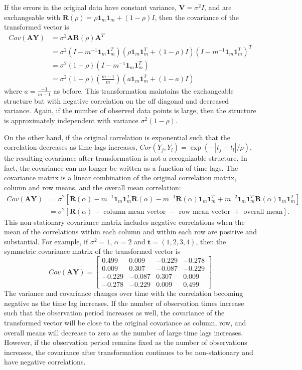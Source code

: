 \documentclass[12pt]{article}
\newcommand{\B}[0]{\mathbf}
\begin{document}
 If the errors in the original data have constant variance, $\B V=\sigma^{2}I$, and are exchangeable with $\B R(\rho) = \rho\B 1_{m} \B 1_{m} + (1-\rho) I$, then the covariance of the transformed vector is
 \begin{align*}
 Cov(\B A\B Y) &= \sigma^{2}\B A\B R(\rho)\B A^{T}\\
 &= \sigma^{2}(I-m^{-1}\B1_{m}\B1_{m}^{T})(\rho\B1_{m}\B1_{m}^{T}+(1-\rho)I)(I-m^{-1}\B1_{m}\B1_{m}^{T})^{T}\\
 &= \sigma^{2}(1-\rho)(I-m^{-1}\B1_{m}\B1_{m}^{T})\\
 &=\sigma^{2}(1-\rho)\left(\frac{m-1}{m}\right)(a\B 1_{m}\B 1_{m}^{T}+ (1-a)I)
 \end{align*} 
 where $a=\frac{-1}{m-1}$ as before. This transformation maintains the exchangeable structure but with negative correlation on the off diagonal and decreased variance.  Again, if the number of observed data points is large, then the structure is approximately independent with variance $\sigma^{2}(1-\rho)$.

 On the other hand, if the original correlation is exponential such that the correlation decreases as time lags increases, $Cor(Y_{j},Y_{l}) = \exp(-|t_{j}-t_{l}|/\rho)$, the resulting covariance after transformation is not a recognizable structure. In fact, the covariance can no longer be written as a function of time lags. The covariance matrix is a linear combination of the original correlation matrix, column and row means, and the overall mean correlation:
   \begin{align*}
 Cov(\B A\B Y) &= \sigma^{2}\left[\B R(\alpha)-m^{-1}\B1_{m}\B1_{m}^{T}\B R(\alpha)-m^{-1}\B R(\alpha)\B1_{m}\B1_{m}^{T} + m^{-2}\B1_{m}\B1_{m}^{T}\B R(\alpha)\B1_{m}\B1_{m}^{T}\right]\\
  &= \sigma^{2}\left[\B R(\alpha)-\text{ column mean vector }-\text{ row mean vector } + \text{ overall mean}\right].
 \end{align*} 
 This non-stationary covariance matrix includes negative correlations when the mean of the correlations within each column and within each row are positive and substantial. For example, if $\sigma^{2}=1$, $\alpha = 2$ and $\B t=(1,2,3,4)$, then the symmetric covariance matrix of the transformed vector is
$$ Cov(\B A\B Y) = \left[ \begin{array}{cccc}
 0.499&  0.009& -0.229& -0.278\\
  0.009&  0.307& -0.087& -0.229\\
 -0.229& -0.087&  0.307&  0.009\\
 -0.278& -0.229&  0.009&  0.499
\end{array}\right]$$
The variance and covariance changes over time with the correlation becoming negative as the time lag increases.  If the number of observation times increase such that the observation period increases as well, the covariance of the transformed vector will be close to the original covariance as column, row, and overall means will decrease to zero as the number of large time lags increases. However, if the observation period remains fixed as the number of observations increases, the covariance after transformation continues to be non-stationary and have negative correlations.  
\end{document}
